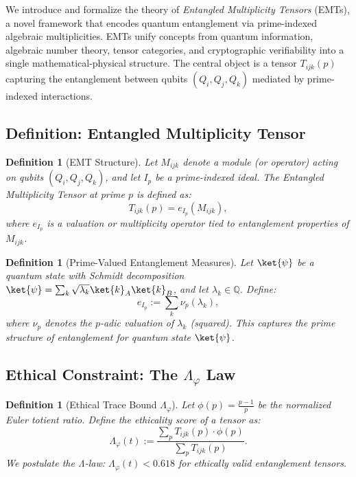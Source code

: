 \documentclass[12]{amsart}
\theoremstyle{plain}
\newtheorem{definition}[theorem]{Definition}
\begin{document}
We introduce and formalize the theory of \emph{Entangled Multiplicity Tensors} (EMTs), a novel framework that encodes quantum entanglement via prime-indexed algebraic multiplicities. EMTs unify concepts from quantum information, algebraic number theory, tensor categories, and cryptographic verifiability into a single mathematical-physical structure. The central object is a tensor $T_{ijk}(p)$ capturing the entanglement between qubits $(Q_i, Q_j, Q_k)$ mediated by prime-indexed interactions.

\subsection{Definition: Entangled Multiplicity Tensor}

\begin{definition}[EMT Structure]
Let $M_{ijk}$ denote a module (or operator) acting on qubits $(Q_i, Q_j, Q_k)$, and let $I_p$ be a prime-indexed ideal. The Entangled Multiplicity Tensor at prime $p$ is defined as:
\[
T_{ijk}(p) = e_{I_p}(M_{ijk}),
\]
where $e_{I_p}$ is a valuation or multiplicity operator tied to entanglement properties of $M_{ijk}$.
\end{definition}

\begin{definition}[Prime-Valued Entanglement Measures]
Let $\ket{\psi}$ be a quantum state with Schmidt decomposition $\ket{\psi} = \sum_k \sqrt{\lambda_k} \ket{k}_A \ket{k}_B$, and let $\lambda_k \in \mathbb{Q}$. Define:
\[
e_{I_p} := \sum_k \nu_p(\lambda_k),
\]
where $\nu_p$ denotes the $p$-adic valuation of $\lambda_k$ (squared). This captures the prime structure of entanglement for quantum state $\ket{\psi}$.
\end{definition}

\subsection{Ethical Constraint: The $\Lambda_\varphi$ Law}

\begin{definition}[Ethical Trace Bound $\Lambda_\varphi$]
Let $\phi(p) = \frac{p - 1}{p}$ be the normalized Euler totient ratio. Define the ethicality score of a tensor as:
\[
\Lambda_\varphi(t) := \frac{\sum_p T_{ijk}(p) \cdot \phi(p)}{\sum_p T_{ijk}(p)}.
\]
We postulate the \emph{Λ-law}: $\Lambda_\varphi(t) < 0.618$ for ethically valid entanglement tensors.
\end{definition}
\end{document}
